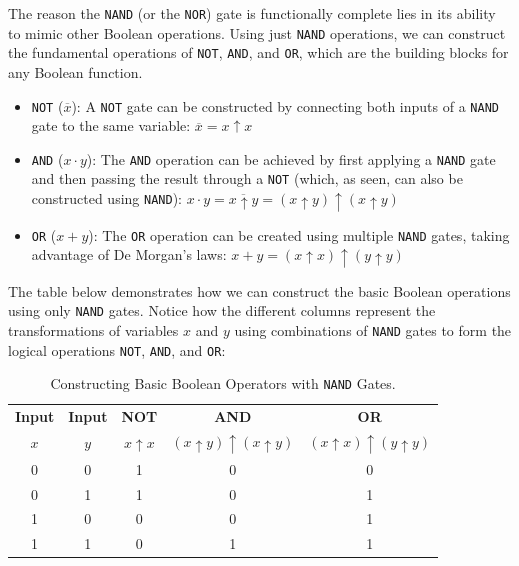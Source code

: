 The reason the \texttt{NAND} (or the \texttt{NOR}) gate is functionally complete lies in its ability to mimic other Boolean operations. Using just \texttt{NAND} operations, we can construct the fundamental operations of \texttt{NOT}, \texttt{AND}, and \texttt{OR}, which are the building blocks for any Boolean function.

\begin{itemize}
\setlength{\itemsep}{10pt}
    \item \texttt{NOT} (\(\overline{x}\)): A \texttt{NOT} gate can be constructed by connecting both inputs of a \texttt{NAND} gate to the same variable:
    \(
    \overline{x} = x \uparrow x
    \)

    \item \texttt{AND} (\(x \cdot y\)): The \texttt{AND} operation can be achieved by first applying a \texttt{NAND} gate and then passing the result through a \texttt{NOT} (which, as seen, can also be constructed using \texttt{NAND}): \newline
   $x \cdot y=\overline{x \uparrow y}=(x \uparrow y) \uparrow(x \uparrow y)$

    \item \texttt{OR} (\(x + y\)): The \texttt{OR} operation can be created using multiple \texttt{NAND} gates, taking advantage of De Morgan’s laws:
    \(
    x + y = (x \uparrow x) \uparrow (y \uparrow y)
    \)
\end{itemize}


The table below demonstrates how we can construct the basic Boolean operations using only \texttt{NAND} gates. Notice how the different columns represent the transformations of variables $x$ and $y$ using combinations of \texttt{NAND} gates to form the logical operations \texttt{NOT}, \texttt{AND}, and \texttt{OR}:

\begin{table}[h!]
    \begin{center}
    \renewcommand{\arraystretch}{1.5} %
    \begin{tabular}{|c|c|c|c|c|}
    \textbf{Input} & \textbf{Input} & \textbf{NOT} & \textbf{AND} & \textbf{OR} \\
    $x$ & $y$ & $x \uparrow x$ & $(x \uparrow y) \uparrow (x \uparrow y)$ & $(x \uparrow x) \uparrow (y \uparrow y)$ \\
    \hline
    0 & 0 & 1 & 0 & 0 \\
    0 & 1 & 1 & 0 & 1 \\
    1 & 0 & 0 & 0 & 1 \\
    1 & 1 & 0 & 1 & 1 \\
    \end{tabular}
    \end{center}
    \caption{Constructing Basic Boolean Operators with \texttt{NAND} Gates.}
\end{table}

